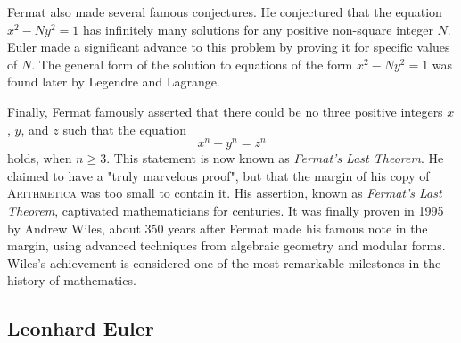 Fermat also made several famous conjectures. He conjectured that the equation $x^2- Ny^2=1$ has infinitely many solutions for any positive non-square integer $N$. Euler made a significant advance to this problem by proving it for specific values of $N$. The general form of the solution to equations of the form $x^2-Ny^2=1$ was found later by Legendre and Lagrange.

Finally, Fermat famously asserted that there could be no three positive integers $x$, $y$, and $z$ such that the equation
\begin{equation*}
  x^n+y^n=z^n
\end{equation*}
holds, when $n\geq 3$. This statement is now known as \emph{Fermat's Last Theorem}. He claimed to have a "truly marvelous proof", but that the margin of his copy of \textsc{Arithmetica} was too small to contain it. His assertion, known as \emph{Fermat's Last Theorem}, captivated mathematicians for centuries. It was finally proven in 1995 by Andrew Wiles, about 350 years after Fermat made his famous note in the margin, using advanced techniques from algebraic geometry and modular forms. Wiles’s achievement is considered one of the most remarkable milestones in the history of mathematics.

\subsection{Leonhard Euler}

